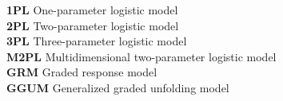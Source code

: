 \textbf{1PL}\hspace{0.5cm}  One-parameter logistic model\\
\textbf{2PL}\hspace{0.5cm}  Two-parameter logistic model\\
\textbf{3PL}\hspace{0.5cm}  Three-parameter logistic model\\
\textbf{M2PL}\hspace{0.5cm}  Multidimensional two-parameter logistic model\\
\textbf{GRM}\hspace{0.5cm}  Graded response model\\
\textbf{GGUM}\hspace{0.5cm}  Generalized graded unfolding model\\












% 
